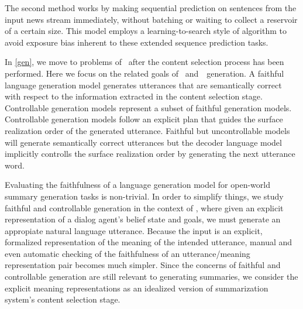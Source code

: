 The second method works by making sequential prediction on sentences from 
the input news stream immediately, without batching or waiting to collect 
a reservoir of a certain size. This model employs a learning-to-search style
of algorithm \cite{searnorlosl} to avoid exposure bias inherent to these
extended sequence prediction tasks.


In \autoref{gen}, we move to problems of \surfacerealization~after the content
selection process has been performed. 
Here we focus on the related goals of
~and~~generation. A faithful language 
generation model generates utterances that are semantically correct
with respect to the information extracted in the 
content selection stage.
Controllable generation models represent a subset of 
faithful generation models. Controllable generation models follow
an explicit plan that guides the surface realization order of the generated utterance.
Faithful but uncontrollable models will generate semantically correct 
utterances but the decoder language model implicitly controlls the surface
realization order by generating the next utterance word.

Evaluating the faithfulness of a language generation model for open-world
summary generation tasks is non-trivial. In order to simplify things,
we study faithful and controllable generation in the context of 
\emph{\taskorienteddialoggeneration}, 
 where given an explicit representation
of a dialog agent's belief state and goals, we must generate an appropiate
natural language utterance. Because the input is an explicit, formalized 
representation of the meaning of the intended utterance, manual and 
even automatic checking of the faithfulness of an
utterance/meaning representation pair becomes much simpler. Since the concerns
of faithful and controllable generation are still relevant to generating
summaries, we consider the explicit meaning representations as 
an idealized version of summarization system's content selection stage.


